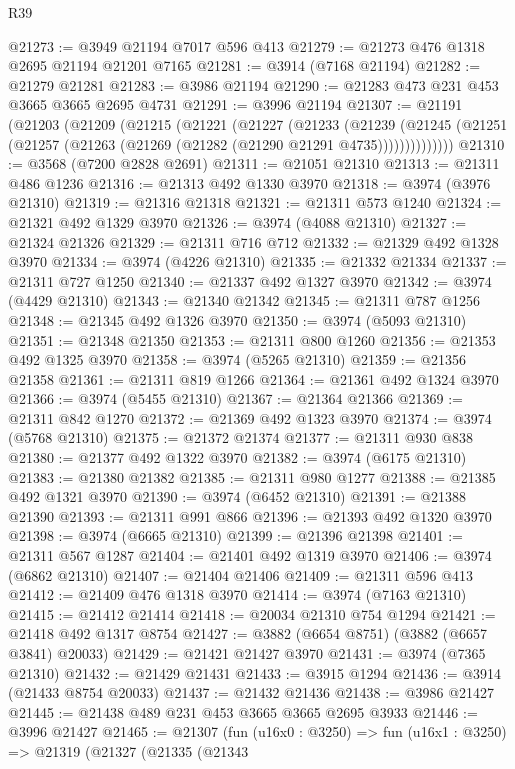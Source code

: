 \begin{lexlean}{R39}
\begin{coremodule}
@21273 := @3949 @21194 @7017 @596 @413
@21279 := @21273 @476 @1318 @2695 @21194 @21201 @7165
@21281 := @3914 (@7168 @21194)
@21282 := @21279 @21281
@21283 := @3986 @21194
@21290 := @21283 @473 @231 @453 @3665 @3665 @2695 @4731
@21291 := @3996 @21194
@21307 := @21191
    (@21203
      (@21209
        (@21215
          (@21221
            (@21227
              (@21233
                (@21239
                  (@21245 (@21251 (@21257 (@21263 (@21269 (@21282 (@21290 @21291 @4735))))))))))))))
@21310 := @3568 (@7200 @2828 @2691)
@21311 := @21051 @21310
@21313 := @21311 @486 @1236
@21316 := @21313 @492 @1330 @3970
@21318 := @3974 (@3976 @21310)
@21319 := @21316 @21318
@21321 := @21311 @573 @1240
@21324 := @21321 @492 @1329 @3970
@21326 := @3974 (@4088 @21310)
@21327 := @21324 @21326
@21329 := @21311 @716 @712
@21332 := @21329 @492 @1328 @3970
@21334 := @3974 (@4226 @21310)
@21335 := @21332 @21334
@21337 := @21311 @727 @1250
@21340 := @21337 @492 @1327 @3970
@21342 := @3974 (@4429 @21310)
@21343 := @21340 @21342
@21345 := @21311 @787 @1256
@21348 := @21345 @492 @1326 @3970
@21350 := @3974 (@5093 @21310)
@21351 := @21348 @21350
@21353 := @21311 @800 @1260
@21356 := @21353 @492 @1325 @3970
@21358 := @3974 (@5265 @21310)
@21359 := @21356 @21358
@21361 := @21311 @819 @1266
@21364 := @21361 @492 @1324 @3970
@21366 := @3974 (@5455 @21310)
@21367 := @21364 @21366
@21369 := @21311 @842 @1270
@21372 := @21369 @492 @1323 @3970
@21374 := @3974 (@5768 @21310)
@21375 := @21372 @21374
@21377 := @21311 @930 @838
@21380 := @21377 @492 @1322 @3970
@21382 := @3974 (@6175 @21310)
@21383 := @21380 @21382
@21385 := @21311 @980 @1277
@21388 := @21385 @492 @1321 @3970
@21390 := @3974 (@6452 @21310)
@21391 := @21388 @21390
@21393 := @21311 @991 @866
@21396 := @21393 @492 @1320 @3970
@21398 := @3974 (@6665 @21310)
@21399 := @21396 @21398
@21401 := @21311 @567 @1287
@21404 := @21401 @492 @1319 @3970
@21406 := @3974 (@6862 @21310)
@21407 := @21404 @21406
@21409 := @21311 @596 @413
@21412 := @21409 @476 @1318 @3970
@21414 := @3974 (@7163 @21310)
@21415 := @21412 @21414
@21418 := @20034 @21310 @754 @1294
@21421 := @21418 @492 @1317 @8754
@21427 := @3882 (@6654 @8751) (@3882 (@6657 @3841) @20033)
@21429 := @21421 @21427 @3970
@21431 := @3974 (@7365 @21310)
@21432 := @21429 @21431
@21433 := @3915 @1294
@21436 := @3914 (@21433 @8754 @20033)
@21437 := @21432 @21436
@21438 := @3986 @21427
@21445 := @21438 @489 @231 @453 @3665 @3665 @2695 @3933
@21446 := @3996 @21427
@21465 := @21307
    (fun (u16x0 : @3250) =>
    fun (u16x1 : @3250) =>
    @21319
      (@21327
        (@21335
          (@21343

\end{coremodule}
\end{lexlean}
